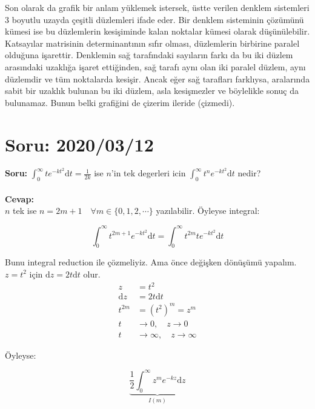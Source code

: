 \documentclass{article}
\numberwithin{equation}{section}
\begin{document}
Son olarak da grafik bir anlam yüklemek istersek, üstte verilen denklem sistemleri 3 boyutlu uzayda çeşitli düzlemleri ifade eder. Bir denklem sisteminin çözümünü kümesi ise bu düzlemlerin kesişiminde kalan noktalar kümesi olarak düşünülebilir. Katsayılar matrisinin determinantının sıfır olması, düzlemlerin birbirine paralel olduğuna işarettir. Denklemin sağ tarafındaki sayıların farkı da bu iki düzlem arasındaki uzaklığa işaret ettiğinden, sağ tarafı aynı olan iki paralel düzlem, aynı düzlemdir ve tüm noktalarda kesişir. Ancak eğer sağ tarafları farklıysa, aralarında sabit bir uzaklık bulunan bu iki düzlem, asla kesişmezler ve böylelikle sonuç da bulunamaz. Bunun belki grafiğini de çizerim ileride (çizmedi).
 






\section{Soru: 2020/03/12}
\textbf{Soru:} $\int_0^\infty te^{-kt^2}\mathrm{d}t = \frac{1}{2k}$ ise $n$'in tek degerleri icin $\int_0^\infty t^ne^{-kt^2}\mathrm{d}t$ nedir?
\\ \\
\textbf{Cevap: }\\

$n$ tek ise $n = 2m+1 \quad \forall m \in \{0,1,2,\cdots \}$ yazılabilir. Öyleyse integral: 

\begin{equation}
    \int_0^\infty t^{2m+1}e^{-kt^2}\mathrm{d}t = \int_0^\infty t^{2m}te^{-kt^2}\mathrm{d}t
\end{equation}

Bunu integral reduction ile çözmeliyiz. Ama önce değişken dönüşümü yapalım. $z = t^2$ için $\mathrm{d}z = 2t\mathrm{d}t$ olur.
\begin{align}
    z &= t^2 \\
    \mathrm{d}z&= 2t\mathrm{d}t \\
    t^{2m} &= (t^2)^m = z^m \\
    t &\rightarrow 0, \quad z \rightarrow 0 \\
    t &\rightarrow \infty, \quad  z \rightarrow \infty
\end{align}

Öyleyse:

\begin{equation}
     \underbrace{\frac{1}{2} \int_0^\infty z^m e^{-kz}\mathrm{d}z}_{I(m)}
\end{equation}
\end{document}
